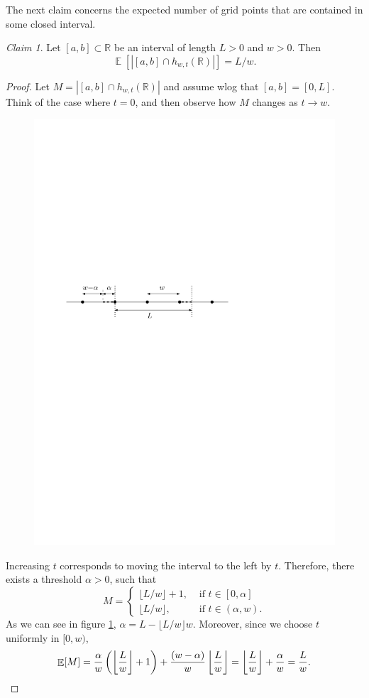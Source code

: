 \documentclass[10pt,a4paper,twoside]{book}
\DeclareMathOperator*{\EE}{\mathbb{E}}
\theoremstyle{definition}
\theoremstyle{remark}
\newtheorem{claim}[definition]{Claim}
\begin{document}
The next claim concerns the expected number of grid points that are contained in some closed interval.
\begin{claim} \label{claim:1dgrid}
Let $[a,b] \subset \mathbb{R}$ be an interval of length $L>0$ and $w>0$. Then
\[ \EE[|[a,b] \cap h_{w,t}(\mathbb{R})|] = L/w.\]
\end{claim}
\begin{proof}
Let $M = |[a,b] \cap h_{w,t}(\mathbb{R})|$ and assume wlog that $[a,b] = [0,L]$. Think of the case where $t=0$, and then observe how $M$ changes as $t \rightarrow w$. 
\begin{figure}[ht]
    \centering
    \includegraphics[scale=0.65]{figures/gridline2.pdf}
    \caption{}
    \label{fig:gridline}
\end{figure}

Increasing $t$ corresponds to moving the interval to the left by $t$. Therefore, there exists a threshold $\alpha>0$, such that 
\[
M=
\begin{cases}
\lfloor L/w \rfloor +1, & \text{ if } t \in [0, \alpha]\\
\lfloor L/w \rfloor, & \text{ if } t \in (\alpha, w).
\end{cases}
\]
As we can see in figure \ref{fig:gridline}, $\alpha =L-  \lfloor L/w \rfloor w$. Moreover, since we choose $t$ uniformly in $[0,w)$,
\[
\EE[M] = \frac{\alpha}{w} \left( \left \lfloor \frac{L}{w} \right \rfloor +1 \right) + \frac{(w- \alpha)}{w} \left \lfloor \frac{L}{w} \right \rfloor = \left \lfloor \frac{L}{w} \right \rfloor + \frac{\alpha}{w} = \frac{L}{w}. \qedhere
\]
\end{proof}
\end{document}

